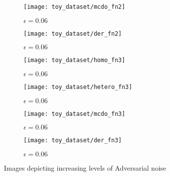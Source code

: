 \begin{figure}[h]\ContinuedFloat
	\centering
	\begin{subfigure}[b]{0.4\textwidth}
	\centering
	\texttt{[image: toy\_dataset/mcdo\_fn2]}
	\caption{$\epsilon=0.06$}
	\label{fig:five over x}
	\end{subfigure}
	\hfill
	\begin{subfigure}[b]{0.4\textwidth}
	\centering
	\texttt{[image: toy\_dataset/der\_fn2]}
	\caption{$\epsilon=0.06$}
	\label{fig:five over x}
	\end{subfigure}
	\hfill
	\begin{subfigure}[b]{0.4\textwidth}
	\centering
	\texttt{[image: toy\_dataset/homo\_fn3]}
	\caption{$\epsilon=0.06$}
	\label{fig:five over x}
	\end{subfigure}
	\hfill
	\begin{subfigure}[b]{0.4\textwidth}
	\centering
	\texttt{[image: toy\_dataset/hetero\_fn3]}
	\caption{$\epsilon=0.06$}
	\label{fig:five over x}
	\end{subfigure}
	\hfill
	\begin{subfigure}[b]{0.4\textwidth}
	\centering
	\texttt{[image: toy\_dataset/mcdo\_fn3]}
	\caption{$\epsilon=0.06$}
	\label{fig:five over x}
	\end{subfigure}
	\hfill
	\begin{subfigure}[b]{0.4\textwidth}
	\centering
	\texttt{[image: toy\_dataset/der\_fn3]}
	\caption{$\epsilon=0.06$}
	\label{fig:five over x}
	\end{subfigure}
	\hfill
	\caption{Images depicting increasing levels of Adversarial noise}
	\label{fig_adv_example}
\end{figure}

